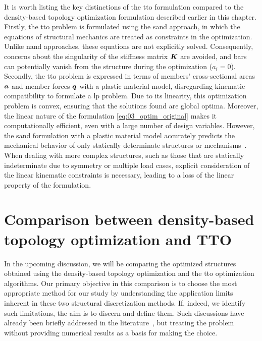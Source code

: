 It is worth listing the key distinctions of the \gls{tto} formulation compared to the density-based topology optimization formulation described earlier in this chapter. Firstly, the \gls{tto} problem is formulated using the \gls{sand} approach, in which the equations of structural mechanics are treated as constraints in the optimization. Unlike \gls{nand} approaches, these equations are not explicitly solved. Consequently, concerns about the singularity of the stiffness matrix $\bm{K}$ are avoided, and bars can potentially vanish from the structure during the optimization ($a_i=0$). Secondly, the \gls{tto} problem is expressed in terms of members' cross-sectional areas $\bm{a}$ and member forces $\bm{q}$ with a plastic material model, disregarding kinematic compatibility to formulate a \gls{lp} problem. Due to its linearity, this optimization problem is convex, ensuring that the solutions found are global optima. Moreover, the linear nature of the formulation \ref{eq:03_optim_original} makes it computationally efficient, even with a large number of design variables. However, the \gls{sand} formulation with a plastic material model accurately predicts the mechanical behavior of only statically determinate structures or mechanisms~. When dealing with more complex structures, such as those that are statically indeterminate due to symmetry or multiple load cases, explicit consideration of the linear kinematic constraints is necessary, leading to a loss of the linear property of the formulation.

\section{Comparison between density-based topology optimization and TTO} \label{sec:03_comparison}
In the upcoming discussion, we will be comparing the optimized structures obtained using the density-based topology optimization and the \gls{tto} optimization algorithms. Our primary objective in this comparison is to choose the most appropriate method for our study by understanding the application limits inherent in these two structural discretization methods. If, indeed, we identify such limitations, the aim is to discern and define them. Such discussions have already been briefly addressed in the literature~, but treating the problem without providing numerical results as a basis for making the choice.


